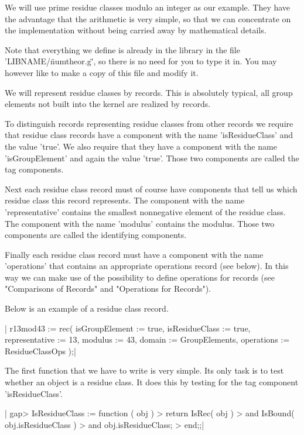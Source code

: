 We will use prime residue classes modulo an integer as our example.  They
have the advantage that  the arithmetic is very simple, so  that  we  can
concentrate  on   the  implementation  without  being  carried   away  by
mathematical details.

Note  that  everything we  define is already in  the library  in the file
'LIBNAME/\"numtheor.g\"', so there is no need for you to type it in.  You
may however like to make a copy of this file and modify it.

We will   represent  residue  classes  by  records.   This  is absolutely
typical, all group elements not built into the {\GAP} kernel are realized
by records.

To distinguish records representing residue classes from other records we
require   that residue  class records   have a  component   with the name
'isResidueClass' and the value 'true'.  We also require that they  have a
component with the  name 'isGroupElement'  and  again  the value  'true'.
Those two components are called the tag components.

Next each residue  class record must  of course have components that tell
us which  residue class this record represents.    The component with the
name 'representative'  contains the  smallest nonnegative element  of the
residue class.   The  component  with  the  name 'modulus'  contains  the
modulus.  Those two components are called the identifying components.

Finally each  residue class record must  have a  component with  the name
'operations' that contains an appropriate  operations record (see below).
In this way  we can make use of the possibility  to define operations for
records (see "Comparisons of Records" and "Operations for Records").

Below is an example of a residue class record.

|    r13mod43 := rec(
        isGroupElement := true,
        isResidueClass := true,
        representative := 13,
        modulus        := 43,
        domain         := GroupElements,
        operations     := ResidueClassOps );|

The first function that  we have to write is  very simple.  Its only task
is to test whether an object is a residue class.  It does this by testing
for the tag component 'isResidueClass'.

|    gap> IsResidueClass := function ( obj )
    >     return IsRec( obj )
    >            and IsBound( obj.isResidueClass )
    >            and obj.isResidueClass;
    > end;;|

